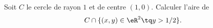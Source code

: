 \begin{exercice}\label{exoIntegralesMultiples0016}

 Soit \( C\) le cercle de rayon \( 1\) et de centre \( (1,0)\). Calculer l'aire de 
            \begin{equation}
                C\cap\{ (x,y)\in \eR^2\tq y>1/2 \}.
            \end{equation}

\end{exercice}
